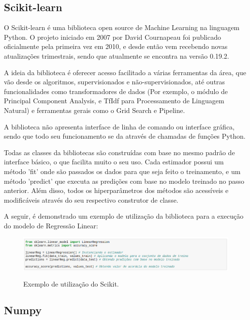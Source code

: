 \subsection{Scikit-learn}
\label{ss.scikit}

O Scikit-learn é uma biblioteca open source de Machine Learning na linguagem Python. O projeto iniciado em 2007 por David Cournapeau foi publicado oficialmente pela primeira vez em 2010, e desde então vem recebendo novas atualizações trimestrais, sendo que atualmente se encontra na versão 0.19.2. \cite{sklearn_api}

A ideia da biblioteca é oferecer acesso facilitado a várias ferramentas da área, que vão desde os algoritmos, supervisionados e não-supervisionados, até outras funcionalidades como transformadores de dados (Por exemplo, o módulo de Principal Component Analysis, e TfIdf para Processamento de Linguagem Natural) e ferramentas gerais como o Grid Search e Pipeline. \cite{scikit-learn}

A biblioteca não apresenta interface de linha de comando ou interface gráfica, sendo que todo seu funcionamento se da através de chamadas de funções Python. 

Todas as classes da bibliotecas são construídas com base no mesmo padrão de interface básico, o que facilita muito o seu uso. Cada estimador possui um método 'fit' onde são passados os dados para que seja feito o treinamento, e um método 'predict' que executa as predições com base no modelo treinado no passo anterior. Além disso, todos os hiperparâmetros dos métodos são acessíveis e modificáveis através do seu respectivo construtor de classe.


A seguir, é demonstrado um exemplo de utilização da biblioteca para a execução do modelo de Regressão Linear:

\begin{figure}[h]
\caption{\small Exemplo de utilização do Scikit.}
\centering
\includegraphics[scale=0.40]{figs/exemplo-scikit.png}
\label{f.exemplo-scikit}
\end{figure}


\subsection{Numpy}
\label{ss.numpy}

